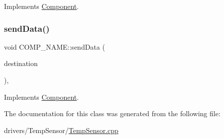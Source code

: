 Implements \hyperlink{classComponent_a56baf8afdea3366554b3c7b13fd6e3f7}{Component}.

\mbox{\label{classCOMP__NAME_ac981fe25a24ee01c160d08f0a970fab1}} 
\subsubsection{\texorpdfstring{send\+Data()}{sendData()}}
{\footnotesize\ttfamily void C\+O\+M\+P\+\_\+\+N\+A\+M\+E\+::send\+Data (\begin{DoxyParamCaption}\item[{\hyperlink{structLogicalAddress}{Logical\+Address}}]{destination }\end{DoxyParamCaption})\hspace{0.3cm}{\ttfamily [inline]}, {\ttfamily [virtual]}}



Implements \hyperlink{classComponent_a492a20dc97b9563d80443dda2f1057ec}{Component}.



The documentation for this class was generated from the following file\+:\begin{DoxyCompactItemize}
\item 
drivers/\+Temp\+Sensor/\hyperlink{TempSensor_8cpp}{Temp\+Sensor.\+cpp}\end{DoxyCompactItemize}
